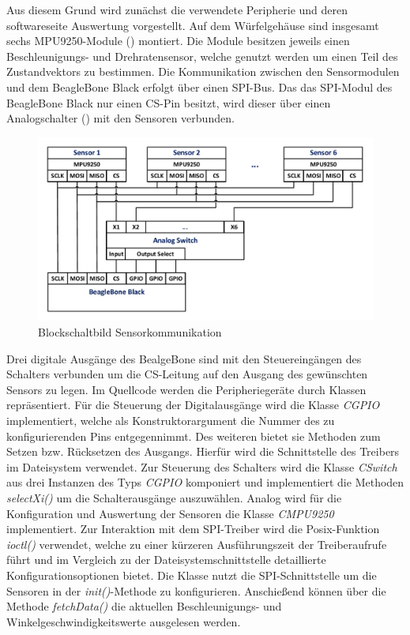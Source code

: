 Aus diesem Grund wird zunächst die verwendete Peripherie und deren softwareseite Auswertung vorgestellt. Auf dem Würfelgehäuse sind insgesamt sechs MPU9250-Module (\cite{MPU9250}) montiert. Die Module besitzen jeweils einen Beschleunigungs- und Drehratensensor, welche genutzt werden um einen Teil des Zustandvektors zu bestimmen. Die Kommunikation zwischen den Sensormodulen und dem BeagleBone Black erfolgt über einen SPI-Bus. Das das SPI-Modul des BeagleBone Black nur einen CS-Pin besitzt, wird dieser über einen Analogschalter (\cite{MAX4617}) mit den Sensoren verbunden.
\begin{figure}[!h]
\centering
\includegraphics[width=0.7\linewidth]{img/SW_0_Sensoren_BSB.pdf}
\caption{Blockschaltbild Sensorkommunikation}
\end{figure}
Drei digitale Ausgänge des BealgeBone sind mit den Steuereingängen des Schalters verbunden um die CS-Leitung auf den Ausgang des gewünschten Sensors zu legen.
Im Quellcode werden die Peripheriegeräte durch Klassen repräsentiert. Für die Steuerung der Digitalausgänge wird die Klasse \textit{CGPIO} implementiert, welche als Konstruktorargument die Nummer des zu konfigurierenden Pins entgegennimmt. Des weiteren bietet sie Methoden zum Setzen bzw. Rücksetzen des Ausgangs. Hierfür wird die Schnittstelle des Treibers im Dateisystem verwendet. Zur Steuerung des Schalters wird die Klasse \textit{CSwitch} aus drei Instanzen des Typs \textit{CGPIO} komponiert und implementiert die Methoden \textit{selectXi()} um die Schalterausgänge auszuwählen.
Analog wird für die Konfiguration und Auswertung der Sensoren die Klasse \textit{CMPU9250} implementiert. Zur Interaktion mit dem SPI-Treiber wird die Posix-Funktion \textit{ioctl()} verwendet, welche zu einer kürzeren Ausführungszeit der Treiberaufrufe führt und im Vergleich zu der Dateisystemschnittstelle detaillierte Konfigurationsoptionen bietet. Die Klasse nutzt die SPI-Schnittstelle um die Sensoren in der \textit{init()}-Methode zu konfigurieren. Anschießend können über die Methode \textit{fetchData()} die aktuellen Beschleunigungs- und Winkelgeschwindigkeitswerte ausgelesen werden.

